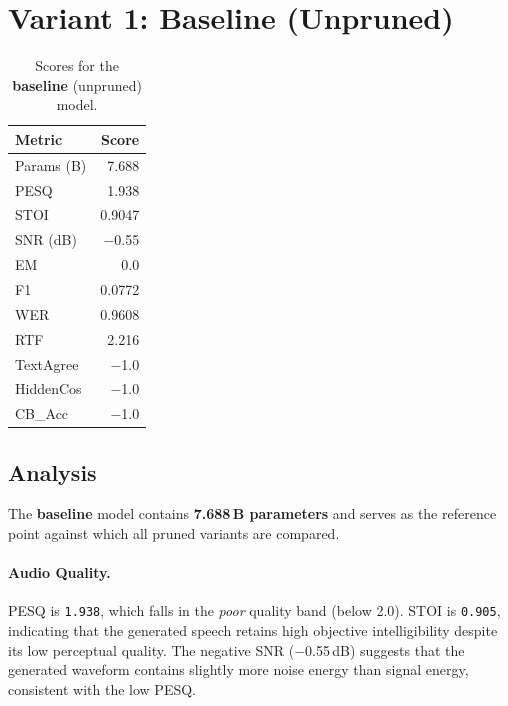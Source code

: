 \documentclass[11pt,a4paper]{article}
\newcommand{\scoreval}[1]{\texttt{#1}}
\begin{document}
\newpage
\section{Variant 1: Baseline (Unpruned)}

\begin{table}[H]
\centering
\caption{Scores for the \textbf{baseline} (unpruned) model.}
\begin{tabular}{l r}
\toprule
\textbf{Metric} & \textbf{Score} \\
\midrule
Params (B)    & 7.688 \\
PESQ          & 1.938 \\
STOI          & 0.9047 \\
SNR (dB)      & $-$0.55 \\
EM            & 0.0 \\
F1            & 0.0772 \\
WER           & 0.9608 \\

RTF           & 2.216 \\
TextAgree     & $-$1.0 \\
HiddenCos     & $-$1.0 \\
CB\_Acc       & $-$1.0 \\
\bottomrule
\end{tabular}
\end{table}

\subsection{Analysis}

The \textbf{baseline} model contains \textbf{7.688\,B parameters} and serves as the reference point against which all pruned variants are compared.

\paragraph{Audio Quality.}
PESQ is \scoreval{1.938}, which falls in the \emph{poor} quality band (below 2.0). STOI is \scoreval{0.905}, indicating that the generated speech retains high objective intelligibility despite its low perceptual quality. The negative SNR ($-$0.55\,dB) suggests that the generated waveform contains slightly more noise energy than signal energy, consistent with the low PESQ.
\end{document}
